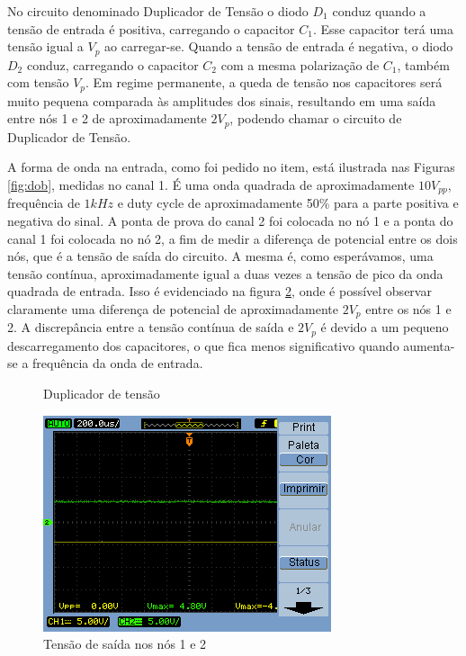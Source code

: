 \documentclass[a4paper]{article} %
\begin{document}
No circuito denominado Duplicador de Tensão o diodo $D_1$ conduz quando a tensão de entrada é positiva, carregando o capacitor $C_1$. Esse capacitor terá uma tensão igual a $V_p$ ao carregar-se. Quando a tensão de entrada é negativa, o diodo $D_2$ conduz, carregando o capacitor $C_2$ com a mesma polarização de $C_1$, também com tensão $V_p$. Em regime permanente, a queda de tensão nos capacitores será muito pequena comparada às amplitudes dos sinais, resultando em uma saída entre nós 1 e 2 de aproximadamente $2V_p$, podendo chamar o circuito de Duplicador de Tensão.

A forma de onda na entrada, como foi pedido no item, está ilustrada nas Figuras \ref{fig:dob}, medidas no canal 1.
É uma onda quadrada de aproximadamente $10 V_{pp}$, frequência de $1kHz$ e duty cycle de aproximadamente
50\% para a parte positiva e negativa do sinal. A ponta de prova do canal 2 foi colocada no nó 1 e a ponta do canal 1 foi colocada no nó 2, a fim de medir
a diferença de potencial entre os dois nós, que é a tensão de saída do circuito. A
mesma é, como esperávamos, uma tensão contínua, aproximadamente igual a
duas vezes a tensão de pico da onda quadrada de entrada.
Isso é evidenciado na figura \ref{fig:dob-no12}, onde é possível observar claramente uma diferença de potencial de aproximadamente $2V_p$ entre os nós 1 e 2. A discrepância entre a tensão contínua de saída e $2V_p$ é devido a um pequeno descarregamento dos capacitores, o que fica menos significativo quando aumenta-se a frequência da onda de entrada.



 \setcounter{figure}{0}
\vspace{3mm}
\begin{figure}[h]
\centerline{}
\caption{Duplicador de tensão \label{tab:circ}}
\end{figure}

\newpage
\begin{figure}[h!]
\begin{centering}
\includegraphics[scale=0.55]{Imagens/3.4duplicador_tensao/423} \caption{Tensão de saída nos nós 1 e 2 \label{fig:dob-no12}}
\par\end{centering}
\end{figure}
\end{document}
